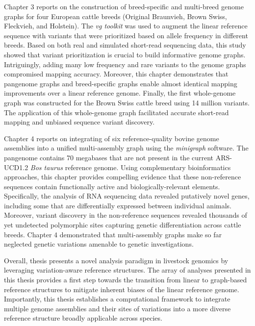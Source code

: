 \documentclass[11 pt, a4paper, notitlepage, twoside]{report}
\begin{document}
Chapter 3 reports on the construction of breed-specific and multi-breed genome graphs for four European cattle breeds (Original Braunvieh, Brown Swiss, Fleckvieh, and Holstein).  The \emph{vg toolkit} was used to augment the linear reference sequence with variants that were prioritized based on allele frequency in different breeds. Based on both real and simulated short-read sequencing data, this study showed that variant prioritization is crucial to build informative genome graphs. Intriguingly, adding many low frequency and rare variants to the genome graphs compromised mapping accuracy. Moreover, this chapter demonstrates that pangenome graphs and breed-specific graphs enable almost identical mapping improvements over a linear reference genome. Finally, the first whole-genome graph was constructed for the Brown Swiss cattle breed using 14 million variants. The application of this whole-genome graph facilitated accurate short-read mapping and unbiased sequence variant discovery. 

\thispagestyle{plain}

Chapter 4 reports on integrating of six reference-quality bovine genome assemblies into a unified multi-assembly graph using the \emph{minigraph} software. The pangenome contains 70 megabases that are not present in the current ARS-UCD1.2 \emph{Bos taurus} reference genome.  Using complementary bioinformatics approaches, this chapter provides compelling evidence that these non-reference sequences contain functionally active and biologically-relevant elements. Specifically, the analysis of RNA sequencing data revealed putatively novel genes, including some that are differentially expressed between individual animals. Moreover, variant discovery in the non-reference sequences revealed thousands of yet undetected polymorphic sites capturing genetic differentiation across cattle breeds. Chapter 4 demonstrated that multi-assembly graphs make so far neglected genetic variations amenable to genetic investigations. 

Overall, thesis presents a novel analysis paradigm in livestock genomics by leveraging variation-aware reference structures. The array of analyses presented in this thesis provides a first step towards the transition from linear to graph-based reference structures to mitigate inherent biases of the linear reference genome. Importantly, this thesis establishes a computational framework to integrate multiple genome assemblies and their sites of variations into a more diverse reference structure broadly applicable across species. 
\end{document}
